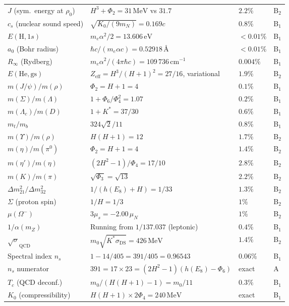 \documentclass[11pt,a4paper]{article}
\theoremstyle{definition}
\theoremstyle{remark}
\begin{document}
\begin{longtable}{p{3.8cm}p{7.2cm}p{3.0cm}l}
$J$ (sym.\ energy at $\rho_0$) & $H^3+\Phi_2=31\,\mathrm{MeV}$ vs $31.7$ & $2.2\%$ & B$_2$ \\
$c_s$ (nuclear sound speed) & $\sqrt{K_0/(9m_N)}=0.169c$ & $0.8\%$ & B$_1$ \\
$E(\mathrm{H},1s)$ & $m_e\alpha^2/2=13.606\,\mathrm{eV}$ & $<0.01\%$ & B$_1$ \\
$a_0$ (Bohr radius) & $\hbar c/(m_e\alpha c)=0.52918\,\text{\AA}$ & $<0.01\%$ & B$_1$ \\
$R_\infty$ (Rydberg) & $m_e\alpha^2/(4\pi\hbar c)=109\,736\,\mathrm{cm}^{-1}$ & $0.004\%$ & B$_1$ \\
$E(\mathrm{He},\mathrm{gs})$ & $Z_\mathrm{eff}=H^3/(H+1)^2=27/16$, variational & $1.9\%$ & B$_2$ \\
$m(J/\psi)/m(\rho)$ & $\Phi_2=H+1=4$ & $0.1\%$ & B$_1$ \\
$m(\Sigma)/m(\Lambda)$ & $1+\Phi_6/\Phi_4^2=1.07$ & $0.2\%$ & B$_1$ \\
$m(\Lambda_c)/m(D)$ & $1+K^*=37/30$ & $0.6\%$ & B$_1$ \\
$m_t/m_b$ & $324\sqrt{2}/11$ & $0.8\%$ & B$_1$ \\
$m(\Upsilon)/m(\rho)$ & $H(H+1)=12$ & $1.7\%$ & B$_2$ \\
$m(\eta)/m(\pi^0)$ & $\Phi_2=H+1=4$ & $1.4\%$ & B$_2$ \\
$m(\eta')/m(\eta)$ & $(2H^2-1)/\Phi_4=17/10$ & $2.8\%$ & B$_2$ \\
$m(K)/m(\pi)$ & $\sqrt{\Phi_3}=\sqrt{13}$ & $2.2\%$ & B$_2$ \\
$\Delta m^2_{21}/\Delta m^2_{32}$ & $1/(h(E_8)+H)=1/33$ & $1.3\%$ & B$_2$ \\
$\Sigma$ (proton spin) & $1/H=1/3$ & $1\%$ & B$_2$ \\
$\mu(\Omega^-)$ & $3\mu_s=-2.00\,\mu_N$ & $1\%$ & B$_2$ \\
$1/\alpha(m_Z)$ & Running from $1/137.037$ (leptonic) & $0.4\%$ & B$_1$ \\
$\sqrt{\sigma}_\mathrm{QCD}$ & $m_0\sqrt{K^*\sigma_\mathrm{DS}}=426\,\mathrm{MeV}$ & $1.4\%$ & B$_2$ \\
Spectral index $n_s$ & $1-14/405=391/405=0.96543$ & $0.06\%$ & B$_1$ \\
$n_s$ numerator & $391=17\times 23=(2H^2-1)(h(E_8)-\Phi_6)$ & exact & A \\
$T_c$ (QCD deconf.) & $m_0/(H(H+1)-1)=m_0/11$ & $0.3\%$ & B$_1$ \\
$K_0$ (compressibility) & $H(H+1)\times 2\Phi_4=240\,\mathrm{MeV}$ & exact & B$_1$ \\

\end{longtable}
\end{document}
